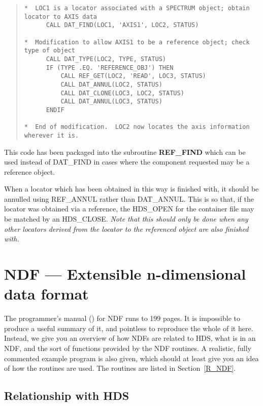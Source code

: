 \begin{quote}

\begin{small}
\begin{verbatim}
*  LOC1 is a locator associated with a SPECTRUM object; obtain locator to AXIS data
      CALL DAT_FIND(LOC1, 'AXIS1', LOC2, STATUS)

*  Modification to allow AXIS1 to be a reference object; check type of object
      CALL DAT_TYPE(LOC2, TYPE, STATUS)
      IF (TYPE .EQ. 'REFERENCE_OBJ') THEN
          CALL REF_GET(LOC2, 'READ', LOC3, STATUS)
          CALL DAT_ANNUL(LOC2, STATUS)
          CALL DAT_CLONE(LOC3, LOC2, STATUS)
          CALL DAT_ANNUL(LOC3, STATUS)
      ENDIF

*  End of modification.  LOC2 now locates the axis information wherever it is.
\end{verbatim}
\end{small}

\end{quote}
This code has been packaged into the subroutine {\bf REF\_FIND} which can be
used instead of DAT\_FIND in cases where the component requested may be a
reference object.

When a locator which has been obtained in this way is finished with, it should
be annulled using REF\_ANNUL rather than DAT\_ANNUL.
This is so that, if the locator was obtained via a reference, the HDS\_OPEN for
the container file may be matched by an HDS\_CLOSE.
{\em Note that this should only be done when any other locators derived from
the locator to the referenced object are also finished with.}

\section{NDF --- Extensible n-dimensional data format}
\label{S_progndf}

The programmer's manual () for NDF runs to 199 pages.
It is impossible to produce a useful summary of it, and pointless to reproduce
the whole of it here.
Instead, we give you an overview of how NDFs are related to HDS, what is in an
NDF, and the sort of functions provided by the NDF routines.
A realistic, fully commented example program is also given, which should at
least give you an idea of how the routines are used.
The routines are listed in Section~\ref{R_NDF}.

\subsection{Relationship with HDS}

